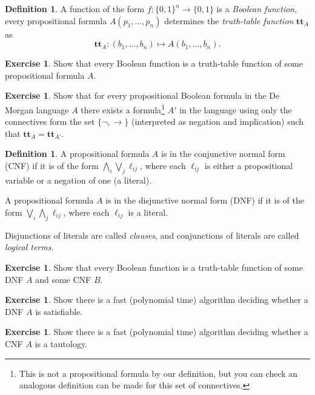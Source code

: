 \documentclass{article}
\theoremstyle{definition}
\newtheorem{excs}[thrm]{Exercise}
\newtheorem{defi}[thrm]{Definition}
\newcommand{\Land}{\bigwedge}
\newcommand{\Lor}{\bigvee}
\begin{document}
\begin{defi}
    A function of the form $f:\{0,1\}^n\to\{0,1\}$ is a \emph{Boolean function}, every propositional formula $A(p_1,\dots,p_n)$ determines the \emph{truth-table function} $\textbf{tt}_A$ as \[\textbf{tt}_A: (b_1,\dots,b_n)\mapsto A(b_1,\dots,b_n).\]
\end{defi}

\begin{excs}
    Show that every Boolean function is a truth-table function of some propositional formula $A$. 
\end{excs}

\begin{excs}
    Show that for every propositional Boolean formula in the De Morgan language $A$ there exists a formula\footnote{This is not a propositional formula by our definition, but you can check an analogous definition can be made for this set of connectives.} $A'$ in the language using only the connectives form the set $\{\lnot, \to\}$ (interpreted as negation and implication) such that $\textbf{tt}_A = \textbf{tt}_{A'}$.
\end{excs}

\begin{defi}
    A propositional formula $A$ is in the conjunctive normal form (CNF) if it is of the form $\Land_i \Lor_j \ell_{ij}$, where each $\ell_{ij}$ is either a propositional variable or a negation of one (a literal).

    A propositional formula $A$ is in the disjunctive normal form (DNF) if it is of the form $\Lor_i \Land_j \ell_{ij}$, where each $\ell_{ij}$ is a literal.

    Disjunctions of literals are called \emph{clauses}, and conjunctions of literals are called \emph{logical terms}.
\end{defi}

\begin{excs}
    Show that every Boolean function is a truth-table function of some DNF $A$ and some CNF $B$.
\end{excs}

\begin{excs}
    Show there is a fast (polynomial time) algorithm deciding whether a DNF $A$ is satisfiable.
\end{excs}

\begin{excs}
    Show there is a fast (polynomial time) algorithm deciding whether a CNF $A$ is a tautology.
\end{excs}
\end{document}
